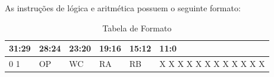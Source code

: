 \documentclass{report}
\begin{document}
As instruções de lógica e aritmética possuem o seguinte formato:
\FloatBarrier
\begin{table}[H]
    \begin{center}
    \renewcommand{\arraystretch}{1.5}
        \begin{tabular}[pos]{|>{\centering\arraybackslash}m{33pt}|>{\centering\arraybackslash}m{55pt}|>{\centering\arraybackslash}m{44pt}|>{\centering\arraybackslash}m{44pt}|>{\centering\arraybackslash}m{44pt}|>{\centering\arraybackslash}m{132pt}|} 
          \hline
          \cellcolor[gray]{0.9}\textbf{31:29} & \cellcolor[gray]{0.9}\textbf{28:24} & \cellcolor[gray]{0.9}\textbf{23:20} & \cellcolor[gray]{0.9}\textbf{19:16} & \cellcolor[gray]{0.9}\textbf{15:12} & \cellcolor[gray]{0.9}\textbf{11:0} \\ \hline
            0 0 1   & OP    & WC    & RA    & RB    &   X X X X X X X X X X X X \\ \hline
        \end{tabular}
        \caption{Tabela de Formato}
    \end{center}
\end{table}  
\end{document}
